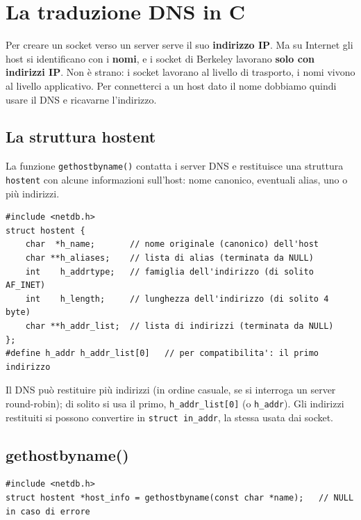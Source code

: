 \section{La traduzione DNS in C}

Per creare un socket verso un server serve il suo \textbf{indirizzo IP}. Ma su Internet gli host si
identificano con i \textbf{nomi}, e i socket di Berkeley lavorano \textbf{solo con indirizzi IP}. Non è
strano: i socket lavorano al livello di trasporto, i nomi vivono al livello applicativo. Per connetterci a un
host dato il nome dobbiamo quindi usare il DNS e ricavarne l'indirizzo.

\subsection{La struttura hostent}

La funzione \texttt{gethostbyname()} contatta i server DNS e restituisce una struttura \texttt{hostent} con
alcune informazioni sull'host: nome canonico, eventuali alias, uno o più indirizzi.

\begin{lstlisting}[language={[POSIX]C}]
#include <netdb.h>
struct hostent {
    char  *h_name;       // nome originale (canonico) dell'host
    char **h_aliases;    // lista di alias (terminata da NULL)
    int    h_addrtype;   // famiglia dell'indirizzo (di solito AF_INET)
    int    h_length;     // lunghezza dell'indirizzo (di solito 4 byte)
    char **h_addr_list;  // lista di indirizzi (terminata da NULL)
};
#define h_addr h_addr_list[0]   // per compatibilita': il primo indirizzo
\end{lstlisting}

Il DNS può restituire più indirizzi (in ordine casuale, se si interroga un server round-robin); di solito si
usa il primo, \texttt{h\_addr\_list[0]} (o \texttt{h\_addr}). Gli indirizzi restituiti si possono convertire in
\texttt{struct in\_addr}, la stessa usata dai socket.

\subsection{gethostbyname()}

\begin{lstlisting}[language={[POSIX]C}]
#include <netdb.h>
struct hostent *host_info = gethostbyname(const char *name);   // NULL in caso di errore
\end{lstlisting}

